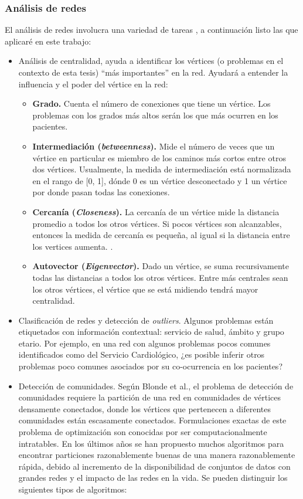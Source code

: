 \subsubsection{Análisis de redes}
El análisis de redes involucra una variedad de tareas \cite{Tang2010}, a continuación listo las que aplicaré en este trabajo:
\begin{itemize}
  \item Análisis de centralidad, ayuda a identificar los vértices (o problemas en el contexto de esta tesis) “más importantes” en la red. Ayudará a entender la influencia y el poder del vértice en la red:
  
\begin{itemize}
\item \textbf{Grado.}
Cuenta el número de conexiones que tiene un vértice. Los problemas con los grados más altos serán los que más ocurren en los pacientes.
\item \textbf{Intermediación (\textit{betweenness}).} Mide el número de veces que un vértice en particular es miembro de los caminos más cortos entre otros dos vértices.
Usualmente, la medida de intermediación está normalizada en el rango de [0, 1], dónde 0 es un vértice desconectado y 1 un vértice por donde pasan todas las conexiones.\cite{Cook2006,Brath2015GraphData}
\item \textbf{Cercanía (\textit{Closeness}).} La cercanía de un vértice mide la distancia promedio a todos los otros vértices. Si pocos vértices son alcanzables, entonces la medida de cercanía es pequeña, al igual si la distancia entre los vertices aumenta. \cite{Cook2006,Brath2015GraphData}.
\item \textbf{Autovector (\textit{Eigenvector}).} Dado un vértice, se suma recursivamente todas las distancias a todos los otros vértices. Entre más centrales sean los otros vértices, el vértice que se está midiendo tendrá mayor centralidad\cite{Brath2015GraphData}.
\end{itemize}
\item Clasificación de redes y detección de \textit{outliers}. Algunos problemas están etiquetados con información contextual: servicio de salud, ámbito y grupo etario. Por ejemplo, en una red con algunos problemas pocos comunes identificados como del Servicio Cardiológico, ¿es posible inferir otros problemas poco comunes asociados por su co-ocurrencia en los pacientes?
  \item Detección de comunidades. Según Blonde et al.\cite{Blondel2008FastNetworks}, el problema de detección de comunidades requiere la partición de una red en comunidades de vértices densamente conectados, donde los vértices que pertenecen a diferentes comunidades están escasamente conectados. Formulaciones exactas de este problema de optimización son conocidas por ser computacionalmente intratables. En los últimos años se han propuesto muchos algoritmos para encontrar particiones razonablemente buenas de una manera razonablemente rápida, debido al incremento de la disponibilidad de conjuntos de datos con grandes redes y el impacto de las redes en la vida. Se pueden distinguir los siguientes tipos de algoritmos:

\end{itemize}
